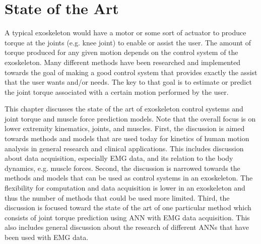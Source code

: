 \chapter{State of the Art}
A typical exoskeleton would have a motor or some sort of actuator to produce torque at the joints (e.g. knee joint) to enable or assist the user.
The amount of torque produced for any given motion depends on the control system of the exoskeleton.
Many different methods have been researched and implemented towards the goal of making a good control system that provides exactly the assist that the user wants and/or needs.
The key to that goal is to estimate or predict the joint torque associated with a certain motion performed by the user.

This chapter discusses the state of the art of exoskeleton control systems and joint torque and muscle force prediction models.
Note that the overall focus is on lower extremity kinematics, joints, and muscles.
First, the discussion is aimed towards methods and models that are used today for kinetics of human motion analysis in general research and clinical applications.
This includes discussion about data acquisition, especially \ac{EMG} data, and its relation to the body dynamics, e.g. muscle forces.
Second, the discussion is narrowed towards the methods and models that can be used as control systems in an exoskeleton.
The flexibility for computation and data acquisition is lower in an exoskeleton and thus the number of methods that could be used more limited.
Third, the discussion is focused toward the state of the art of one particular method which consists of joint torque prediction using \ac{ANN} with \ac{EMG} data acquisition. 
This also includes general discussion about the research of different \acp{ANN} that have been used with \ac{EMG} data.


